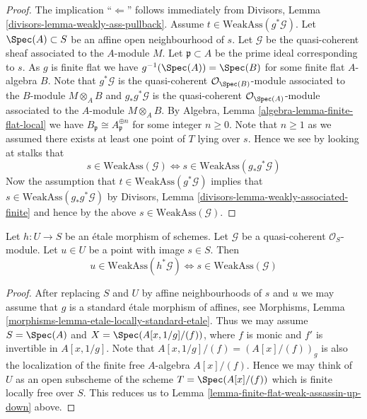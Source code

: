 \begin{proof}
The implication ``$\Leftarrow$'' follows immediately from
Divisors, Lemma \ref{divisors-lemma-weakly-ass-pullback}.
Assume $t \in \text{WeakAss}(g^*\mathcal{G})$.
Let $\Spec(A) \subset S$ be an affine open neighbourhood of $s$.
Let $\mathcal{G}$ be the quasi-coherent sheaf associated to the $A$-module $M$.
Let $\mathfrak p \subset A$ be the prime ideal corresponding to $s$.
As $g$ is finite flat we have $g^{-1}(\Spec(A)) = \Spec(B)$
for some finite flat $A$-algebra $B$. Note that
$g^*\mathcal{G}$ is the quasi-coherent $\mathcal{O}_{\Spec(B)}$-module
associated to the $B$-module $M \otimes_A B$ and $g_*g^*\mathcal{G}$ is the
quasi-coherent $\mathcal{O}_{\Spec(A)}$-module associated to the
$A$-module $M \otimes_A B$. By
Algebra, Lemma \ref{algebra-lemma-finite-flat-local}
we have $B_{\mathfrak p} \cong A_{\mathfrak p}^{\oplus n}$
for some integer $n \geq 0$. Note that $n \geq 1$ as we assumed there
exists at least one point of $T$ lying over $s$. Hence we see by
looking at stalks that
$$
s \in \text{WeakAss}(\mathcal{G})
\Leftrightarrow
s \in \text{WeakAss}(g_*g^*\mathcal{G})
$$
Now the assumption that $t \in \text{WeakAss}(g^*\mathcal{G})$
implies that $s \in \text{WeakAss}(g_*g^*\mathcal{G})$ by
Divisors, Lemma \ref{divisors-lemma-weakly-associated-finite}
and hence by the above $s \in  \text{WeakAss}(\mathcal{G})$.
\end{proof}

\begin{lemma}
\label{lemma-etale-weak-assassin-up-down}
Let $h : U \to S$ be an \'etale morphism of schemes.
Let $\mathcal{G}$ be a quasi-coherent $\mathcal{O}_S$-module.
Let $u \in U$ be a point with image $s \in S$. Then
$$
u \in \text{WeakAss}(h^*\mathcal{G})
\Leftrightarrow
s \in \text{WeakAss}(\mathcal{G})
$$
\end{lemma}

\begin{proof}
After replacing $S$ and $U$ by affine neighbourhoods of $s$ and $u$
we may assume that $g$ is a standard \'etale morphism of affines, see
Morphisms, Lemma \ref{morphisms-lemma-etale-locally-standard-etale}.
Thus we may assume $S = \Spec(A)$ and
$X = \Spec(A[x, 1/g]/(f))$, where $f$ is monic and $f'$
is invertible in $A[x, 1/g]$.
Note that $A[x, 1/g]/(f) = (A[x]/(f))_g$ is also the localization
of the finite free $A$-algebra $A[x]/(f)$. Hence we may think of
$U$ as an open subscheme of the scheme $T = \Spec(A[x]/(f))$
which is finite locally free over $S$. This reduces us to
Lemma \ref{lemma-finite-flat-weak-assassin-up-down}
above.
\end{proof}





